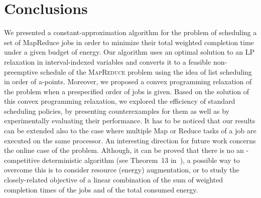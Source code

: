 \documentclass{llncs}
\newcommand{\mr}{\textsc{MapReduce}\xspace}
\begin{document}
\section{Conclusions}\label{se:con}

We presented a constant-approximation algorithm for the problem of scheduling a set of MapReduce jobs
in order to minimize their total weighted completion time under a given budget of energy.
Our algorithm uses an optimal solution to an LP relaxation in interval-indexed variables and converts it to a feasible
non-preemptive schedule of the \mr problem using the idea of list scheduling in order of a-points.
Moreover, we proposed a convex programming relaxation of the problem when a prespecified order of jobs is given.
Based on the solution of this convex programming relaxation, we explored the efficiency of standard scheduling policies,
by presenting counterexamples for them as well as by experimentally evaluating their performance.
It has to be noticed that our results can be extended also to the case where multiple Map or Reduce tasks of a job are executed on the same processor.
An interesting direction for future work concerns the online case of the problem.
Although, it can be proved that there is no an -competitive deterministic algorithm (see Theorem~13 in~\cite{BansalPS09}),
a possible way to overcome this  is to consider resource (energy) augmentation,
or to study the closely-related objective of a linear combination of the sum of weighted completion times of the jobs and of the total consumed energy.
\end{document}
